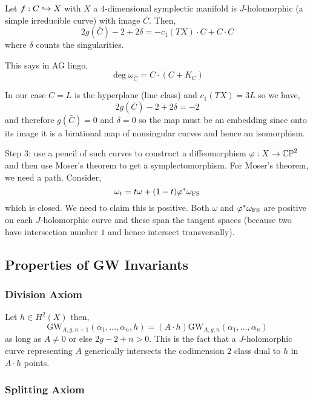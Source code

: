 \documentclass[12pt]{article}
\begin{document}
\begin{prop}[Adjunction]
Let $f : C \hookrightarrow X$ with $X$ a $4$-dimensional symplectic manifold is $J$-holomorphic (a simple irreducible curve) with image $\bar{C}$. Then,
\[ 2 g(\bar{C}) - 2 + 2 \delta = - c_1(TX) \cdot C + C \cdot C \] 
where $\delta$ counts the singularities. 
\end{prop}

\begin{rmk}
This says in AG lingo,
\[ \deg{\omega_{\bar{C}}} = C \cdot (C + K_C) \]
\end{rmk}

\begin{rmk}
In our case $C = L$ is the hyperplane (line class) and $c_1(TX) = 3 L$ so we have,
\[ 2 g(\bar{C}) - 2 + 2 \delta = -2 \]
and therefore $g(\bar{C}) = 0$ and $\delta = 0$ so the map must be an embedding since onto its image it is a birational map of nonsingular curves and hence an isomorphism. 
\end{rmk}

Step 3: use a pencil of such curves to construct a diffeomorphism $\varphi : X \to \mathbb{CP}^2$ and then use Moser's theorem to get a symplectomorphism. For Moser's theorem, we need a path. Consider,
\[ \omega_t = t \omega + (1 - t) \varphi^* \omega_{\text{FS}} \]
which is closed. We need to claim this is positive. Both $\omega$ and $\varphi^* \omega_{\text{FS}}$ are positive on each $J$-holomorphic curve and these span the tangent spaces (because two have intersection number $1$ and hence intersect transversally). 

\subsection{Properties of GW Invariants}


\subsubsection{Division Axiom}

\newcommand{\GW}{\mathrm{GW}}

Let $h \in H^2(X)$ then,
\[ \GW_{A,g,n+1}(\alpha_1, \dots, \alpha_n, h) = (A \cdot h) \GW_{A,g,n}(\alpha_1, \dots, \alpha_n) \]
as long as $A \neq 0$ or else $2 g - 2 + n > 0$. This is the fact that a $J$-holomorphic curve representing $A$ generically intersects the codimension $2$ class dual to $h$ in $A \cdot h$ points. 

\subsubsection{Splitting Axiom}
\end{document}
